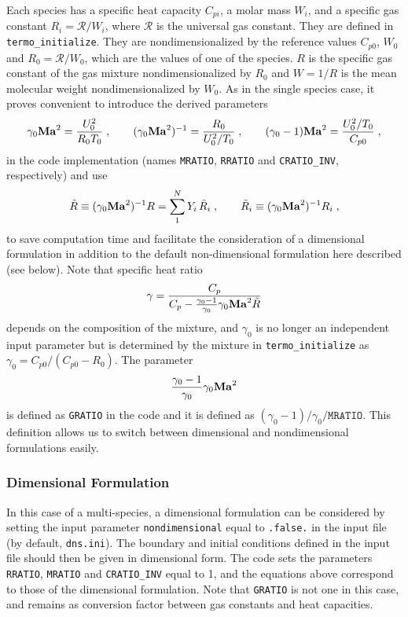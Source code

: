 Each species has a specific heat capacity $C_{pi}$, a molar mass $W_i$, and a specific gas constant $R_i=\mathcal{R}/W_i$, where  $\mathcal{R}$ is the universal gas constant. They are defined in \texttt{termo\_initialize}. They are nondimensionalized by the reference values $C_{p0}$, $W_0$ and $R_0=\mathcal{R}/W_0$, which are the values of one of the species. $R$ is the specific gas constant of the gas mixture nondimensionalized by $R_0$ and $W=1/R$ is the mean molecular weight nondimensionalized by $W_0$. As in the single species case, it proves convenient to introduce the derived parameters
\begin{equation}
    \gamma_0\mathrm{\bf Ma}^2=\frac{U_0^2}{R_0T_0}\;,\qquad (\gamma_0\mathrm{\bf Ma}^2)^{-1}=\frac{R_0}{U^2_0/T_0}\;,\qquad (\gamma_0-1)\mathrm{\bf Ma}^2 =\frac{U_0^2/T_0}{C_{p0}} \;,
\end{equation}
in the code implementation (names \texttt{MRATIO}, \texttt{RRATIO} and \texttt{CRATIO\_INV}, respectively) and use 
\begin{equation}
    \tilde{R}\equiv (\gamma_0\mathrm{\bf Ma}^2)^{-1}R=\sum_1^NY_i\,\tilde{R}_i\;,\qquad\tilde{R}_i\equiv (\gamma_0\mathrm{\bf Ma}^2)^{-1}R_i
    \;,
\end{equation}
to save computation time and facilitate the consideration of a dimensional formulation in addition to the default non-dimensional formulation here described (see below). Note that specific heat ratio
\begin{equation}
    \gamma=\frac{C_p}{C_p-\frac{\gamma_0-1}{\gamma_0}\gamma_0\mathrm{\bf Ma}^2\tilde{R}}
\end{equation}
depends on the composition of the mixture, and $\gamma_0$ is no longer an independent input parameter but is determined by the mixture in \texttt{termo\_initialize} as $\gamma_0=C_{p0}/(C_{p0}-R_0)$. The parameter
\begin{equation}
    \frac{\gamma_0-1}{\gamma_0}\gamma_0\mathrm{\bf Ma}^2
\end{equation}
is defined as \texttt{GRATIO} in the code and it is defined as $(\gamma_0-1)/\gamma_0/\texttt{MRATIO}$. This definition allows us to switch between dimensional and nondimensional formulations easily.


\subsubsection{Dimensional Formulation}

In this case of a multi-species, a dimensional formulation can be considered by setting the input parameter \texttt{nondimensional} equal to \texttt{.false.} in the input file (by default, \texttt{dns.ini}). The boundary and initial conditions defined in the input file should then be given in dimensional form. The code sets the parameters \texttt{RRATIO}, \texttt{MRATIO} and \texttt{CRATIO\_INV} equal to 1, and the equations above correspond to those of the dimensional formulation. Note that \texttt{GRATIO} is not one in this case, and remains as conversion factor between gas constants and heat capacities.

